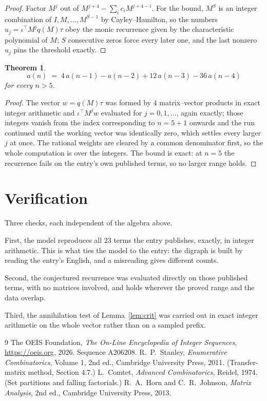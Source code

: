\documentclass[11pt,a4paper]{article}
\theoremstyle{plain}
\newtheorem{theorem}{Theorem}
\theoremstyle{definition}
\begin{document}
\begin{proof}
Factor $M^{j}$ out of $M^{j+4}-\sum_ic_iM^{j+4-i}$. For the bound, $M^{S}$
is an integer combination of $I,M,\dots,M^{S-1}$ by Cayley--Hamilton, so the numbers
$u_j=\iota^{\!\top}M^{j}q(M)\tau$ obey the monic recurrence given by the characteristic
polynomial of $M$; $S$ consecutive zeros force every later one, and the last nonzero $u_j$
pins the threshold exactly.
\end{proof}

\begin{theorem}
\[
a(n)\;=\;4\,a(n-1) - a(n-2) + 12\,a(n-3) - 36\,a(n-4)
\]
for every $n>5$.
\end{theorem}

\begin{proof}
The vector $w=q(M)\tau$ was formed by $4$ matrix--vector products in exact integer
arithmetic and $\iota^{\!\top}M^{j}w$ evaluated for $j=0,1,\dots$, again exactly; those
integers vanish from the index corresponding to $n=5+1$ onwards and the run continued
until the working vector was identically zero, which settles every larger $j$ at once. The
rational weights are cleared by a common denominator first, so the whole computation is over
the integers. The bound is exact: at $n=5$ the recurrence fails on the entry's own published terms, so no larger range holds.
\end{proof}

\section{Verification}

Three checks, each independent of the algebra above.

First, the model reproduces all $23$ terms the entry publishes, exactly, in integer
arithmetic. This is what ties the model to the entry: the digraph is built by reading the
entry's English, and a misreading gives different counts.

Second, the conjectured recurrence was evaluated directly on those published terms, with no
matrices involved, and holds wherever the proved range and the data overlap.

Third, the annihilation test of Lemma~\ref{lem:crit} was carried out in exact integer
arithmetic on the whole vector rather than on a sampled prefix.

\begin{thebibliography}{9}
 The OEIS Foundation, \emph{The On-Line Encyclopedia of Integer
Sequences}, \url{https://oeis.org}, 2026. Sequence A206208.
 R.~P.~Stanley, \emph{Enumerative Combinatorics}, Volume 1, 2nd ed.,
Cambridge University Press, 2011. (Transfer-matrix method, Section 4.7.)
 L.~Comtet, \emph{Advanced Combinatorics}, Reidel, 1974. (Set partitions
and falling factorials.)
 R.~A.~Horn and C.~R.~Johnson, \emph{Matrix Analysis}, 2nd ed., Cambridge
University Press, 2013.
\end{thebibliography}
\end{document}
